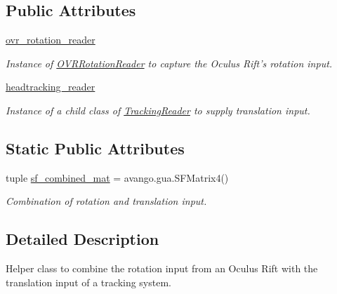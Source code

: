 \subsection*{\-Public \-Attributes}
\begin{DoxyCompactItemize}
\item 
\hyperlink{classlib_1_1OVRUser_1_1TrackingRotationCombiner_a661f1b58b4a6e7af4a03769cf29c70e0}{ovr\-\_\-rotation\-\_\-reader}
\begin{DoxyCompactList}\small\item\em \-Instance of \hyperlink{namespacelib_1_1OVRRotationReader}{\-O\-V\-R\-Rotation\-Reader} to capture the \-Oculus \-Rift's rotation input. \end{DoxyCompactList}\item 
\hyperlink{classlib_1_1OVRUser_1_1TrackingRotationCombiner_af1d1139c73a70aded3d9a4ae8ad3c29f}{headtracking\-\_\-reader}
\begin{DoxyCompactList}\small\item\em \-Instance of a child class of \hyperlink{namespacelib_1_1TrackingReader}{\-Tracking\-Reader} to supply translation input. \end{DoxyCompactList}\end{DoxyCompactItemize}
\subsection*{\-Static \-Public \-Attributes}
\begin{DoxyCompactItemize}
\item 
tuple \hyperlink{classlib_1_1OVRUser_1_1TrackingRotationCombiner_af0898b8f021737fba390f797782860db}{sf\-\_\-combined\-\_\-mat} = avango.\-gua.\-S\-F\-Matrix4()
\begin{DoxyCompactList}\small\item\em \-Combination of rotation and translation input. \end{DoxyCompactList}\end{DoxyCompactItemize}


\subsection{\-Detailed \-Description}
\-Helper class to combine the rotation input from an \-Oculus \-Rift with the translation input of a tracking system. 




